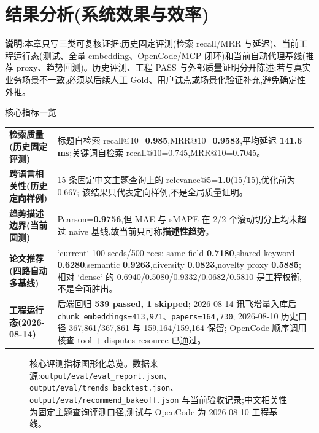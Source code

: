 \section{结果分析(系统效果与效率)}

\begin{plainbox}
\textbf{说明}:本章只写三类可复核证据:历史固定评测(检索 recall/MRR 与延迟)、当前工程运行态(测试、全量 embedding、OpenCode/MCP 闭环)和当前自动代理基线(推荐 proxy、趋势回测)。历史评测、工程 PASS 与外部质量证明分开陈述;若与真实业务场景不一致,必须以后续人工 Gold、用户试点或场景化验证补充,避免确定性外推。
\end{plainbox}

\begin{reportbox}{核心指标一览}
\begin{tableblock}
\begin{tabularx}{0.96\textwidth}{>{\bfseries}p{32mm}X}
\toprule
检索质量(历史固定评测) & 标题自检索 recall@10=\textbf{0.985},MRR@10=\textbf{0.9583},平均延迟 \textbf{141.6 ms};关键词自检索 recall@10=0.745,MRR@10=0.7045。 \\
跨语言相关性(历史定向样例) & 15 条固定中文主题查询上的 relevance@5=\textbf{1.0}(15/15),优化前为 0.667; 该结果只代表定向样例,不是全局质量证明。 \\
趋势描述边界(当前回测) & Pearson=\textbf{0.9756},但 MAE 与 sMAPE 在 2/2 个滚动切分上均未超过 naive 基线,故当前只可称\textbf{描述性趋势}。 \\
论文推荐(四路自动多基线) & `current` 100 seeds/500 recs: same-field \textbf{0.7180},shared-keyword \textbf{0.6280},semantic \textbf{0.9263},diversity \textbf{0.0823},novelty proxy \textbf{0.5885}; 相对 `dense` 的 0.6940/0.5080/0.9332/0.0682/0.5810 是工程权衡,不是全面胜出。 \\
工程运行态(2026-08-14) & 后端回归 \textbf{539 passed, 1 skipped}; 2026-08-14 讯飞增量入库后 \texttt{chunk\_embeddings=413{,}971}、\texttt{papers=164{,}730}; 2026-08-10 历史口径 367{,}861/367{,}861 与 159{,}164/159{,}164 保留; OpenCode 顺序调用核查 tool + disputes resource 已通过。 \\
\bottomrule
\end{tabularx}
\end{tableblock}
\end{reportbox}

\begin{figure}[!htbp]
\centering
{}
\caption{核心评测指标图形化总览。数据来源:\texttt{output/eval/eval\_report.json}、\texttt{output/eval/trends\_backtest.json}、\texttt{output/eval/recommend\_bakeoff.json} 与当前验收记录;中文相关性为固定主题查询评测口径,测试与 OpenCode 为 2026-08-10 工程基线。}
\label{fig:eval-dashboard}
\end{figure}

